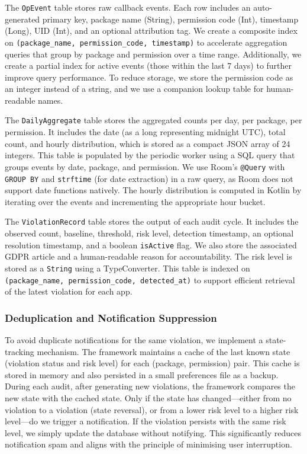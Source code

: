The \texttt{OpEvent} table stores raw callback events. Each row includes an auto-generated primary key, package name (String), permission code (Int), timestamp (Long), UID (Int), and an optional attribution tag. We create a composite index on \texttt{(package\_name, permission\_code, timestamp)} to accelerate aggregation queries that group by package and permission over a time range. Additionally, we create a partial index for active events (those within the last 7 days) to further improve query performance. To reduce storage, we store the permission code as an integer instead of a string, and we use a companion lookup table for human-readable names.

The \texttt{DailyAggregate} table stores the aggregated counts per day, per package, per permission. It includes the date (as a long representing midnight UTC), total count, and hourly distribution, which is stored as a compact JSON array of 24 integers. This table is populated by the periodic worker using a SQL query that groups events by date, package, and permission. We use Room's \texttt{@Query} with \texttt{GROUP BY} and \texttt{strftime} (for date extraction) in a raw query, as Room does not support date functions natively. The hourly distribution is computed in Kotlin by iterating over the events and incrementing the appropriate hour bucket.

The \texttt{ViolationRecord} table stores the output of each audit cycle. It includes the observed count, baseline, threshold, risk level, detection timestamp, an optional resolution timestamp, and a boolean \texttt{isActive} flag. We also store the associated GDPR article and a human-readable reason for accountability. The risk level is stored as a \texttt{String} using a TypeConverter. This table is indexed on \texttt{(package\_name, permission\_code, detected\_at)} to support efficient retrieval of the latest violation for each app.

\subsubsection{Deduplication and Notification Suppression}

To avoid duplicate notifications for the same violation, we implement a state-tracking mechanism. The framework maintains a cache of the last known state (violation status and risk level) for each (package, permission) pair. This cache is stored in memory and also persisted in a small preferences file as a backup. During each audit, after generating new violations, the framework compares the new state with the cached state. Only if the state has changed—either from no violation to a violation (state reversal), or from a lower risk level to a higher risk level—do we trigger a notification. If the violation persists with the same risk level, we simply update the database without notifying. This significantly reduces notification spam and aligns with the principle of minimising user interruption.

